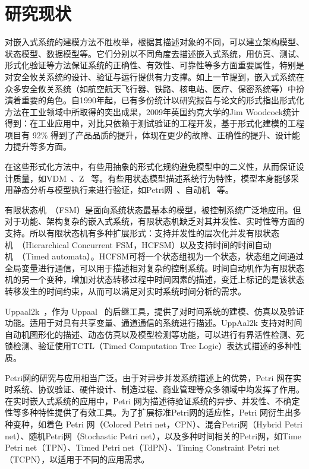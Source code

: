 \section{研究现状}

对嵌入式系统的建模方法不胜枚举，根据其描述对象的不同，可以建立架构模型、状态模型、数据模型等。它们分别以不同角度去描述嵌入式系统，用仿真、测试、形式化验证等方法保证系统的正确性、有效性、可靠性等多方面重要属性，特别是对安全攸关系统的设计、验证与运行提供有力支撑。如上一节提到，嵌入式系统在众多安全攸关系统（如航空航天飞行器、铁路、核电站、医疗、保密系统等）中扮演着重要的角色。自1990年起，已有多份统计以研究报告与论文的形式指出形式化方法在工业领域中所取得的突出成果，2009年英国约克大学的Jim Woodcock统计得到：在工业应用中，对比只依赖于测试验证的工程开发，基于形式化建模的工程项目有 92\% 得到了产品品质的提升，体现在更少的故障、正确性的提升、设计能力提升等多方面。

在这些形式化方法中，有些用抽象的形式化规约避免模型中的二义性，从而保证设计质量，如VDM~\cite{DBLP:conf/fm/1978}、Z~\cite{DBLP:books/daglib/0067866} 等。有些用状态模型描述系统行为特性，模型本身能够采用静态分析与模型执行来进行验证，如Petri网~\cite{murata1989}、自动机~\cite{DBLP:books/aw/HopcroftU79} 等。 

有限状态机~\cite{minsky1967computation}（FSM）是面向系统状态最基本的模型，被控制系统广泛地应用。但对于功能、架构复杂的嵌入式系统，有限状态机缺乏对其并发性、实时性等方面的支持。所以有限状态机有多种扩展形式：支持并发性的层次化并发有限状态机~\cite{DBLP:journals/scp/Harel87}（Hierarchical Concurrent FSM，HCFSM）以及支持时间的时间自动机~\cite{DBLP:journals/tcs/AlurD94,DBLP:conf/cav/Alur99}（Timed automata）。HCFSM可将一个状态组视为一个状态，状态组之间通过全局变量进行通信，可以用于描述相对复杂的控制系统。时间自动机作为有限状态机的另一个变种，增加对状态转移过程中时间因素的描述，变迁上标记的是该状态转移发生的时间约束，从而可以满足对实时系统时间分析的需求。

{\sc Uppaal2k}~\cite{larsen1999uppaal2k}，作为 {\sc Uppaal}~\cite{DBLP:journals/sttt/LarsenPY97} 的后继工具，提供了对时间系统的建模、仿真以及验证功能。适用于对具有共享变量、通道通信的系统进行描述。UppAal2k 支持对时间自动机图形化的描述、动态仿真以及模型检测等功能，可以进行有界活性检测、死锁检测、验证使用TCTL（Timed Computation Tree Logic）表达式描述的多种性质。

Petri网的研究与应用相当广泛。由于对异步并发系统描述上的优势，Petri 网在实时系统、协议验证、硬件设计、制造过程、商业管理等众多领域中均发挥了作用。在实时嵌入式系统的应用中，Petri 网为描述待验证系统的异步、并发性、不确定性等多种特性提供了有效工具。为了扩展标准Petri网的适应性，Petri 网衍生出多种变种，如着色 Petri 网（Colored Petri net，CPN）、混合Petri网（Hybrid Petri net）、随机Petri网（Stochastic Petri net），以及多种时间相关的Petri网，如Time Petri net（TPN）、Timed Petri net（TdPN）、Timing Constraint Petri net（TCPN），以适用于不同的应用需求。

